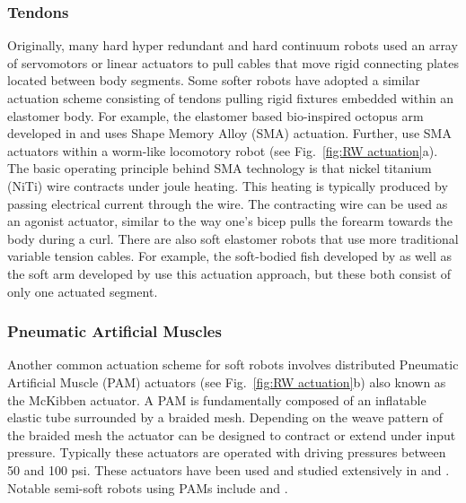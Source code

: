 \subsubsection{Tendons}
\label{subsubsec:RW Tendons}
Originally, many hard hyper redundant and hard continuum robots \citep{cieslak1999elephant, buckingham2002snake, gravagne2002uniform, hannan2003kinematics, mcmahan2005design, camarillo2009configuration} used an array of servomotors or linear actuators to pull cables that move rigid connecting plates located between body segments.
Some softer robots have adopted a similar actuation scheme consisting of tendons pulling rigid fixtures embedded within an elastomer body.
For example, the elastomer based bio-inspired octopus arm developed in  \citet{calisti2010study, laschi2012soft} and \citet{calisti2011octopus} uses Shape Memory Alloy (SMA) actuation.
Further, \citet{seok2010peristaltic} use SMA actuators within a worm-like locomotory robot (see Fig.~\ref{fig:RW actuation}a).
The basic operating principle behind SMA technology is that nickel titanium (NiTi) wire contracts under joule heating.
This heating is typically produced by passing electrical current through the wire.
The contracting wire can be used as an agonist actuator, similar to the way one's bicep pulls the forearm towards the body during a curl.
There are also soft elastomer robots that use more traditional variable tension cables.
For example, the soft-bodied fish developed by \citet{youcef2006design} as well as the soft arm developed by \citet{wang2013visual} use this actuation approach, but these both consist of only one actuated segment.

\subsubsection{Pneumatic Artificial Muscles}
\label{subsubsec:RW PMA}
Another common actuation scheme for soft robots involves distributed Pneumatic Artificial Muscle (PAM) actuators (see Fig.~\ref{fig:RW actuation}b) also known as the McKibben actuator.
A PAM is fundamentally composed of an inflatable elastic tube surrounded by a braided mesh.
Depending on the weave pattern of the braided mesh the actuator can be designed to contract or extend under input pressure.
Typically these actuators are operated with driving pressures between 50 and 100 psi.
These actuators have been used and studied extensively in \citet{chou1996measurement, tondu2000modeling} and \citet{daerden2002pneumatic}.
Notable semi-soft robots using PAMs include \citep{mcmahan2006field, pritts2004design} and \citet{kang2013design}.

